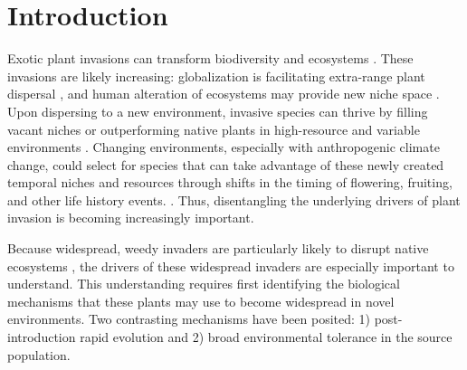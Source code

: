 \documentclass[12pt]{article}\usepackage[]{graphicx}\usepackage[]{color}
\begin{document}
	\section{Introduction} 
	Exotic plant invasions  can transform biodiversity and ecosystems \parencite{Bellard2016, Pejchar2009,Mack2000}. %
These invasions are likely increasing: globalization is facilitating extra-range plant dispersal \parencite{Helmus2014}, and human alteration of ecosystems may provide new niche space \parencite{Tilman2001, Blois2013,Inouye2008,Harte2015}. Upon dispersing to a new environment, invasive species can thrive by filling vacant niches \parencite{Elton1958} or outperforming native plants in high-resource and variable environments \parencite{Davis2001,Daehler2003}. Changing environments, especially with anthropogenic climate change, could select for species that can take advantage of these newly created temporal niches \parencite{Reeb2020} and resources through shifts in the timing of flowering, fruiting, and other life history events. \parencite{Franks2007}. Thus, disentangling the underlying drivers of plant invasion is becoming increasingly important. 

Because widespread, weedy invaders are particularly likely to disrupt native ecosystems \parencite{Cronk2001}, the drivers of these widespread invaders are especially important to understand. This understanding requires first identifying the biological mechanisms that these plants may use to become widespread in novel environments. Two contrasting mechanisms have been posited: 1) post-introduction rapid evolution and 2) broad environmental tolerance in the source population. 
\end{document}
